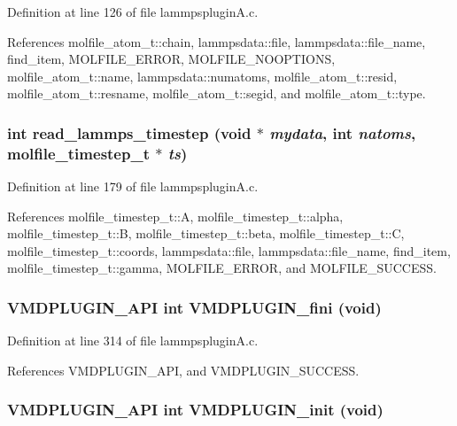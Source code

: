 Definition at line 126 of file lammpsplugin\-A.c.

References molfile\_\-atom\_\-t::chain, lammpsdata::file, lammpsdata::file\_\-name, find\_\-item, MOLFILE\_\-ERROR, MOLFILE\_\-NOOPTIONS, molfile\_\-atom\_\-t::name, lammpsdata::numatoms, molfile\_\-atom\_\-t::resid, molfile\_\-atom\_\-t::resname, molfile\_\-atom\_\-t::segid, and molfile\_\-atom\_\-t::type.
\subsubsection{\setlength{\rightskip}{0pt plus 5cm}int read\_\-lammps\_\-timestep (void $\ast$ {\em mydata}, int {\em natoms}, {\bf molfile\_\-timestep\_\-t} $\ast$ {\em ts})\hspace{0.3cm}{\tt  [static]}}\label{lammpspluginA_8c_a6}




Definition at line 179 of file lammpsplugin\-A.c.

References molfile\_\-timestep\_\-t::A, molfile\_\-timestep\_\-t::alpha, molfile\_\-timestep\_\-t::B, molfile\_\-timestep\_\-t::beta, molfile\_\-timestep\_\-t::C, molfile\_\-timestep\_\-t::coords, lammpsdata::file, lammpsdata::file\_\-name, find\_\-item, molfile\_\-timestep\_\-t::gamma, MOLFILE\_\-ERROR, and MOLFILE\_\-SUCCESS.
\subsubsection{\setlength{\rightskip}{0pt plus 5cm}VMDPLUGIN\_\-API int VMDPLUGIN\_\-fini (void)}\label{lammpspluginA_8c_a10}




Definition at line 314 of file lammpsplugin\-A.c.

References VMDPLUGIN\_\-API, and VMDPLUGIN\_\-SUCCESS.
\subsubsection{\setlength{\rightskip}{0pt plus 5cm}VMDPLUGIN\_\-API int VMDPLUGIN\_\-init (void)}\label{lammpspluginA_8c_a8}




